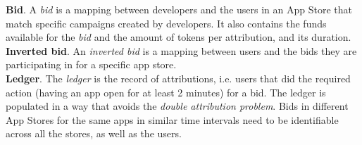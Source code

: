 \noindent \textbf{Bid}. A \textit{bid} is a mapping between developers and the users in an App Store that match specific campaigns created by developers. It also contains the funds available for the \textit{bid} and the amount of tokens per attribution, and its duration.\\

\noindent \textbf{Inverted bid}. An \textit{inverted bid} is a mapping between users and the bids they are participating in for a specific app store.\\

\noindent \textbf{Ledger}. The \textit{ledger} is the record of attributions, i.e. users that did the required action (having an app open for at least 2 minutes) for a bid. The ledger is populated in a way that avoids the \textit{double attribution problem}. Bids in different App Stores for the same apps in similar time intervals need to be identifiable across all the stores, as well as the users.\\



